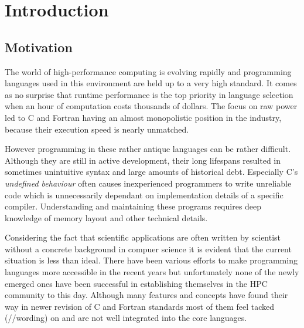 \chapter{Introduction}
\label{chap:Introduction}


\section{Motivation}
\label{sec:Introduction::Motivation}

The world of high-performance computing is evolving rapidly and programming languages used in this environment are held up to a very high standard. It comes as no surprise that runtime performance is the top priority in language selection when an hour of computation costs thousands of dollars.\cite{cost_of_science} The focus on raw power led to C and Fortran having an almost monopolistic position in the industry, because their execution speed is nearly unmatched.

However programming in these rather antique languages can be rather difficult. Although they are still in active development, their long lifespans resulted in sometimes unintuitive syntax and large amounts of historical debt. Especially C's \textit{undefined behaviour} often causes inexperienced programmers to write unreliable code which is unnecessarily dependant on implementation details of a specific compiler. Understanding and maintaining these programs requires deep knowledge of memory layout and other technical details.

Considering the fact that scientific applications are often written by scientist without a concrete background in compuer science it is evident that the current situation is less than ideal. There have been various efforts to make programming languages more accessible in the recent years but unfortunately none of the newly emerged ones have been successful in establishing themselves in the HPC community to this day. Although many features and concepts have found their way in newer revision of C and Fortran standards most of them feel tacked (//wording) on and are not well integrated into the core languages.

